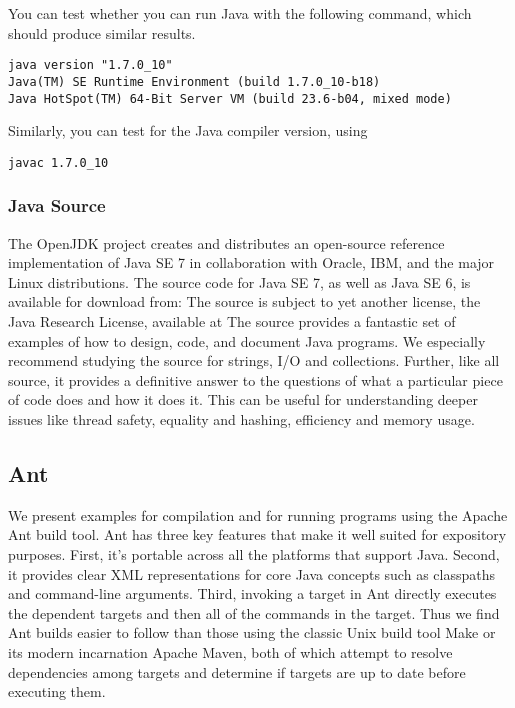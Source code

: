 You can test whether you can run Java with the following command, which
should produce similar results.
%
\begin{verbatim}
java version "1.7.0_10"
Java(TM) SE Runtime Environment (build 1.7.0_10-b18)
Java HotSpot(TM) 64-Bit Server VM (build 23.6-b04, mixed mode)
\end{verbatim}
%
Similarly, you can test for the Java compiler version, using
%
\begin{verbatim}
javac 1.7.0_10
\end{verbatim}


\subsubsection{Java Source}

The OpenJDK project creates and distributes an open-source reference
implementation of Java SE 7 in collaboration with Oracle, IBM, and
the major Linux distributions.  The source code for Java SE 7,
as well as Java SE 6,  is available for download from:
%
%
The source is subject to yet another license, the Java Research License,
available at
%
%
The source provides a fantastic set of examples of how to design,
code, and document Java programs.  We especially recommend studying
the source for strings, I/O and collections.  Further, like all
source, it provides a definitive answer to the questions of what a
particular piece of code does and how it does it.  This can be useful
for understanding deeper issues like thread safety, equality and
hashing, efficiency and memory usage.


\subsection{Ant}

We present examples for compilation and for running programs
using the Apache Ant build tool.  Ant has three key features that make
it well suited for expository purposes.  First, it's portable across
all the platforms that support Java.  Second, it provides clear XML
representations for core Java concepts such as classpaths and
command-line arguments.  Third, invoking a target in Ant directly
executes the dependent targets and then all of the commands in the
target.  Thus we find Ant builds easier to follow than those using the
classic Unix build tool Make or its modern incarnation Apache Maven, both
of which attempt to resolve dependencies among targets and determine
if targets are up to date before executing them.

